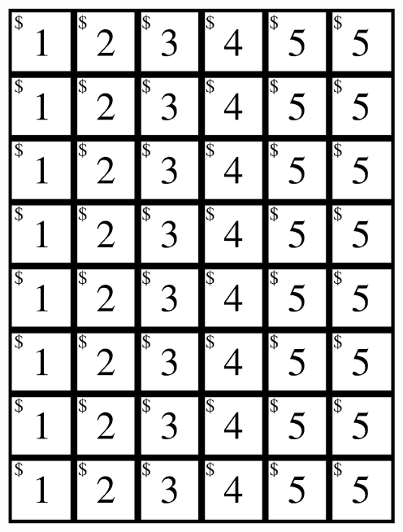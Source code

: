 \documentclass[12pt]{article}
\begin{document}
\begin{center}
\includegraphics[width=5in]{moneySheet.eps}

\vfill

\newpage

~\vfill


\end{center}
\end{document}
